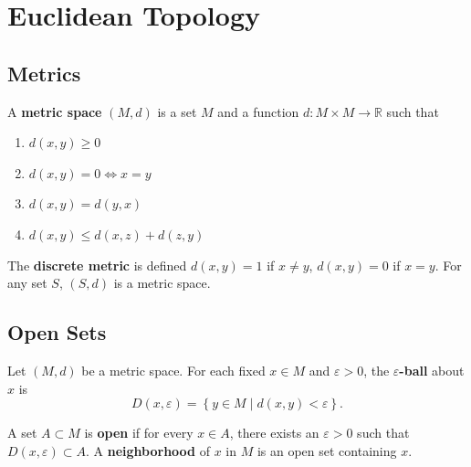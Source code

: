 \documentclass[twoside,10pt]{report}
\begin{document}
\tableofcontents



\chapter{Euclidean Topology}


\section{Metrics}

\begin{defn}[]
	A \textbf{metric space} $(M,d)$ is a set $M$ and a function $d: M \times M \to \mathbb{R}$ such that
	\begin{enumerate}
		\item $d(x,y) \geq 0$ 
		\item $d(x,y) = 0 \iff x=y$ 
		\item $d(x,y) = d(y,x)$ 
		\item $d(x,y) \leq d(x,z) + d(z,y)$
	\end{enumerate}
\end{defn}

\begin{ex}[]
	 The \textbf{discrete metric} is defined $d(x,y)=1$ if $x\neq y$, $d(x,y)=0$ if $x=y$. For any set $S$, $(S,d)$ is a metric space.
\end{ex}


\section{Open Sets}

\begin{defn}[]
	Let $(M,d)$ be a metric space. For each fixed $x\in M$ and $\varepsilon>0$, the \textbf{$\varepsilon$-ball} about $x$ is
	\[
		D(x,\varepsilon) = \left\{ y \in M \;|\; d(x,y) < \varepsilon \right\}.
	\] 
\end{defn}

\begin{defn}[]
	A set $A  \subset M$ is \textbf{open} if for every $x \in A$, there exists an $\varepsilon>0$ such that $D(x,\varepsilon) \subset A$. A \textbf{neighborhood} of $x$ in $M$ is an open set containing $x$.
\end{defn}
\end{document}

